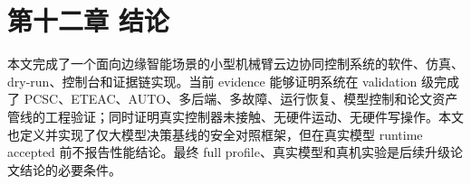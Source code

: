 \chapter{第十二章 结论}

本文完成了一个面向边缘智能场景的小型机械臂云边协同控制系统的软件、仿真、dry-run、控制台和证据链实现。当前 evidence 能够证明系统在 validation 级完成了 PCSC、ETEAC、AUTO、多后端、多故障、运行恢复、模型控制和论文资产管线的工程验证；同时证明真实控制器未接触、无硬件运动、无硬件写操作。本文也定义并实现了仅大模型决策基线的安全对照框架，但在真实模型 runtime accepted 前不报告性能结论。最终 full profile、真实模型和真机实验是后续升级论文结论的必要条件。\par
